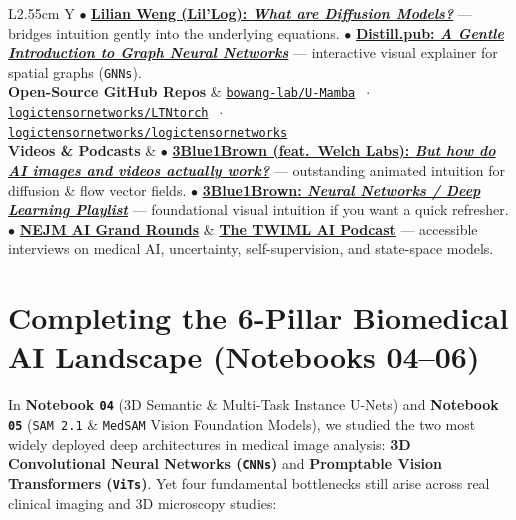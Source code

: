 \documentclass[10.5pt,a4paper]{article}
\begin{document}
\begin{table}[H]
\begin{tabularx}{\textwidth}{L{2.55cm} Y}
$\bullet$ \href{https://lilianweng.github.io/posts/2021-07-11-diffusion-models/}{\textbf{Lilian Weng (Lil'Log): \emph{What are Diffusion Models?}}} --- bridges intuition gently into the underlying equations. \newline
$\bullet$ \href{https://distill.pub/2021/gnn-intro/}{\textbf{Distill.pub: \emph{A Gentle Introduction to Graph Neural Networks}}} --- interactive visual explainer for spatial graphs (\texttt{GNNs}). \\
\textbf{Open-Source GitHub Repos} &
\href{https://github.com/bowang-lab/U-Mamba}{\texttt{bowang-lab/U-Mamba}} $\;\cdot\;$
\href{https://github.com/logictensornetworks/LTNtorch}{\texttt{logictensornetworks/LTNtorch}} $\;\cdot\;$
\href{https://github.com/logictensornetworks/logictensornetworks}{\texttt{logictensornetworks/logictensornetworks}} \\
\textbf{Videos \& Podcasts} &
$\bullet$ \href{https://www.youtube.com/watch?v=iv-5mZ_9CPY}{\textbf{3Blue1Brown (feat.\ Welch Labs): \emph{But how do AI images and videos actually work?}}} --- outstanding animated intuition for diffusion \& flow vector fields. \newline
$\bullet$ \href{https://www.youtube.com/playlist?list=PLZHQObOWTQDNU6R1_67000Dx_ZCJB-3pi}{\textbf{3Blue1Brown: \emph{Neural Networks / Deep Learning Playlist}}} --- foundational visual intuition if you want a quick refresher. \newline
$\bullet$ \href{https://ai-podcast.nejm.org/}{\textbf{NEJM AI Grand Rounds}} \& \href{https://twimlai.com/}{\textbf{The TWIML AI Podcast}} --- accessible interviews on medical AI, uncertainty, self-supervision, and state-space models. \\
\bottomrule
\end{tabularx}
\caption{Curated non-technical reviews, visual tutorials, GitHub repositories, videos, and podcasts for the frontier paradigms in Notebook~\texttt{06}.}
\label{tab:nontech-frontier-resources}
\end{table}

\section{Completing the 6-Pillar Biomedical AI Landscape (Notebooks 04--06)}

In \textbf{Notebook \texttt{04}} (3D Semantic \& Multi-Task Instance U-Nets) and \textbf{Notebook \texttt{05}} (\texttt{SAM 2.1} \& \texttt{MedSAM} Vision Foundation Models), we studied the two most widely deployed deep architectures in medical image analysis: \textbf{3D Convolutional Neural Networks (\texttt{CNNs})} and \textbf{Promptable Vision Transformers (\texttt{ViTs})}. Yet four fundamental bottlenecks still arise across real clinical imaging and 3D microscopy studies:
\end{document}
